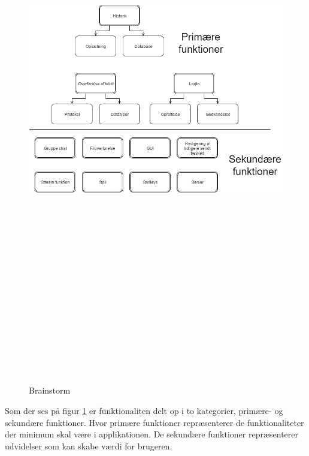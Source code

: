 \begin{figure}[ht]
	\centering
	\includegraphics[width=15cm,height=25cm,keepaspectratio]{pictures/Ideudvikling.png}
	\caption{Brainstorm}
	\label{fig:brain}
\end{figure}
\newline
Som der ses på figur \ref{fig:brain} er funktionaliten delt op i to kategorier, primære- og sekundære funktioner. Hvor primære funktioner repræsenterer de funktionaliteter der minimum skal være i applikationen. De sekundære funktioner repræsenterer udvidelser som kan skabe værdi for brugeren.

